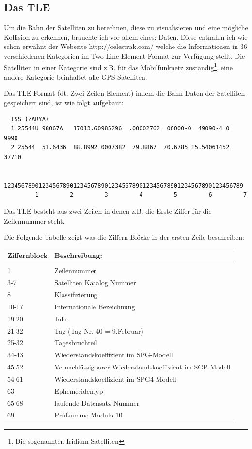 \subsection{Das TLE} \label{Das TLE}
Um die Bahn der Satelliten zu berechnen, diese zu visualisieren und eine mögliche Kollision zu 
erkennen, brauchte ich vor allem eines: Daten.
Diese entnahm ich wie schon erwähnt der Webseite http://celestrak.com/ welche die Informationen in 36
verschiedenen Kategorien im Two-Line-Element Format zur Verfügung stellt. Die Satelliten in einer Kategorie
sind z.B. für das Mobilfunknetz zuständig\footnote{Die sogenannten Iridium Satelliten},
eine andere Kategorie beinhaltet alle GPS-Satelliten.
\par

Das TLE Format (dt. Zwei-Zeilen-Element) indem die Bahn-Daten der Satelliten gespeichert sind, ist
wie folgt aufgebaut:

\begin{verbatim}
  ISS (ZARYA)             
  1 25544U 98067A   17013.60985296  .00002762  00000-0  49090-4 0  9990
  2 25544  51.6436  88.8992 0007382  79.8867  70.6785 15.54061452 37710
 
  123456789012345678901234567890123456789012345678901234567890123456789
         1         2         3         4         5         6         7
\end{verbatim}

\bigskip

Das TLE besteht aus zwei Zeilen in denen z.B. die Erste Ziffer für die
Zeilennummer steht. 

Die Folgende Tabelle zeigt was die Ziffern-Blöcke in der ersten Zeile beschreiben:

\bigskip
  
\begin{tabular}{l|l}
 Ziffernblock & Beschreibung: \\\hline
 & \\
 1 & Zeilennummer \\[0,1cm]
 3-7 & Satelliten Katalog Nummer \\[0,1cm]
 8 & Klassifizierung \\[0,1cm]
 10-17 & Internationale Bezeichnung \\[0,1cm]
 19-20 & Jahr \\[0,1cm]
 21-32 & Tag (Tag Nr. 40 = 9.Februar) \\[0,1cm]
 25-32 & Tagesbruchteil \\[0,1cm]
 34-43 & Wiederstandskoeffizient im SPG-Modell \\[0,1cm]
 45-52 & Vernachlässigbarer Wiederstandskoeffizient im SGP-Modell\\[0,1cm]
 54-61 & Wiederstandskoeffizient im SPG4-Modell \\[0,1cm]
 63 & Ephemeridentyp \\[0,1cm]
 65-68 & laufende Datensatz-Nummer \\[0,1cm]
 69 & Prüfsumme Modulo 10 \\[0,1cm]
 
\end{tabular}

